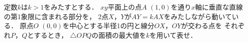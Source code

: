 \documentclass[../../main.tex]{subfiles}
\begin{document}
定数$k$は$k>1$をみたすとする．
$xy$平面上の点$A$ $(1,0)$を通り$x$軸に垂直な直線の第1象限に含まれる部分を，
2点$X$，$Y$が$AY=kAX$をみたしながら動いている．
原点$O$ $(0,0)$を中心とする半径1の円と線分$OX$，$OY$が交わる点を
それぞれ$P$，$Q$とするとき，
$\triangle OPQ$の面積の最大値を$k$を用いて表せ．
\end{document}
